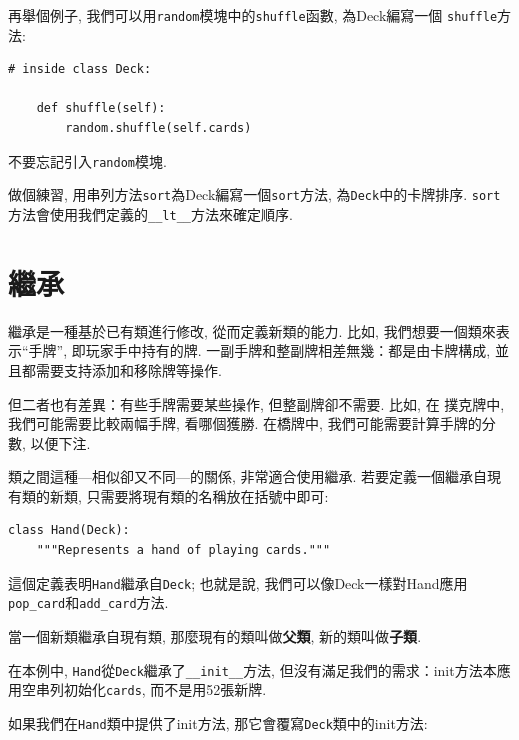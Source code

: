\documentclass[10pt]{book}
\begin{document}
再舉個例子, 我們可以用{\tt random}模塊中的{\tt shuffle}函數, 為Deck編寫一個
{\tt shuffle}方法:

\begin{verbatim}
# inside class Deck:
            
    def shuffle(self):
        random.shuffle(self.cards)
\end{verbatim}
%
不要忘記引入{\tt random}模塊.

做個練習, 用串列方法{\tt sort}為Deck編寫一個{\tt sort}方法, 
為{\tt Deck}中的卡牌排序. 
{\tt sort}方法會使用我們定義的\verb"__lt__"方法來確定順序. 
 



\section{繼承}

繼承是一種基於已有類進行修改, 從而定義新類的能力. 
比如, 我們想要一個類來表示``手牌'', 即玩家手中持有的牌. 
一副手牌和整副牌相差無幾：都是由卡牌構成, 並且都需要支持添加和移除牌等操作. 

但二者也有差異：有些手牌需要某些操作, 但整副牌卻不需要. 比如, 在
撲克牌中, 我們可能需要比較兩幅手牌, 看哪個獲勝. 
在橋牌中, 我們可能需要計算手牌的分數, 以便下注. 

類之間這種---相似卻又不同---的關係, 非常適合使用繼承. 
若要定義一個繼承自現有類的新類, 只需要將現有類的名稱放在括號中即可:

\begin{verbatim}
class Hand(Deck):
    """Represents a hand of playing cards."""
\end{verbatim}
%
這個定義表明{\tt Hand}繼承自{\tt Deck};
也就是說, 我們可以像Deck一樣對Hand應用\verb"pop_card"和\verb"add_card"方法.

當一個新類繼承自現有類, 那麼現有的類叫做{\bf 父類}, 
新的類叫做{\bf 子類}.

在本例中, {\tt Hand}從{\tt Deck}繼承了\verb"__init__"方法, 
但沒有滿足我們的需求：init方法本應用空串列初始化{\tt cards}, 
而不是用52張新牌. 
 

如果我們在{\tt Hand}類中提供了init方法, 那它會覆寫{\tt Deck}類中的init方法:
\end{document}
